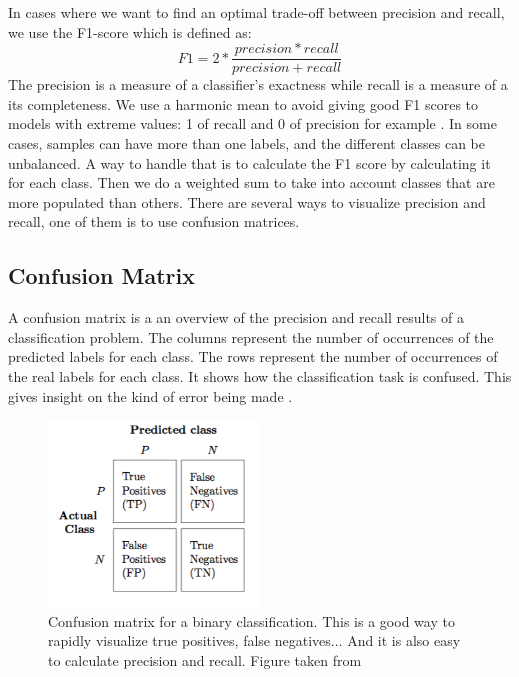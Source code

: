  In cases where we want to find an optimal trade-off between precision and recall, we use the F1-score which is defined as: 
 \begin{equation}
     F1 = 2*\frac{precision * recall}{precision + recall}
 \end{equation}
 The precision is a measure of a classifier's exactness while recall is a measure of a its completeness. 
 We use a harmonic mean to avoid giving good F1 scores to models with extreme values: 1 of recall and 0 of precision for example \cite{wiki-f1}. 
In some cases, samples can have more than one labels, and the different classes can be unbalanced. A way to handle that is to calculate the F1 score by calculating it for each class.  Then we do a weighted sum to take into account classes that are more populated than others. 
There are several ways to visualize precision and recall, one of them is to use confusion matrices. 
\subsection{Confusion Matrix}
A confusion matrix is a an overview of the precision and recall results of a classification problem. The columns represent the number of occurrences of the predicted labels for each class. The rows represent the number of occurrences of the real labels for each class. It shows how the classification task is confused. This gives insight on the kind of error being made \cite{cm}. 

\begin{figure}[h]
    \centering
        \includegraphics[width=0.5\textwidth]{figures/02-CM}
        \caption[Confusion matrix]{Confusion matrix for a binary classification. This is a good way to rapidly visualize true positives, false negatives... And it is also easy to calculate precision and recall. Figure taken from \cite{cm_image}}\label{fig:CM}
\end{figure}

